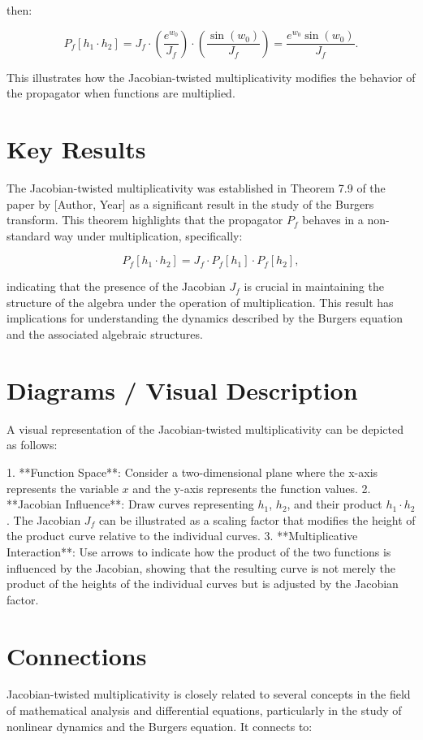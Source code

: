 \documentclass[11pt,a4paper]{article}
\begin{document}
then:

\[
P_f[h_1 \cdot h_2] = J_f \cdot \left(\frac{e^{w_0}}{J_f}\right) \cdot \left(\frac{\sin(w_0)}{J_f}\right) = \frac{e^{w_0} \sin(w_0)}{J_f}.
\]

This illustrates how the Jacobian-twisted multiplicativity modifies the behavior of the propagator when functions are multiplied.

\section{Key Results}
The Jacobian-twisted multiplicativity was established in Theorem 7.9 of the paper by [Author, Year] as a significant result in the study of the Burgers transform. This theorem highlights that the propagator $P_f$ behaves in a non-standard way under multiplication, specifically:

\[
P_f[h_1 \cdot h_2] = J_f \cdot P_f[h_1] \cdot P_f[h_2],
\]

indicating that the presence of the Jacobian $J_f$ is crucial in maintaining the structure of the algebra under the operation of multiplication. This result has implications for understanding the dynamics described by the Burgers equation and the associated algebraic structures.

\section{Diagrams / Visual Description}
A visual representation of the Jacobian-twisted multiplicativity can be depicted as follows:

1. **Function Space**: Consider a two-dimensional plane where the x-axis represents the variable $x$ and the y-axis represents the function values.
2. **Jacobian Influence**: Draw curves representing $h_1$, $h_2$, and their product $h_1 \cdot h_2$. The Jacobian $J_f$ can be illustrated as a scaling factor that modifies the height of the product curve relative to the individual curves.
3. **Multiplicative Interaction**: Use arrows to indicate how the product of the two functions is influenced by the Jacobian, showing that the resulting curve is not merely the product of the heights of the individual curves but is adjusted by the Jacobian factor.

\section{Connections}
Jacobian-twisted multiplicativity is closely related to several concepts in the field of mathematical analysis and differential equations, particularly in the study of nonlinear dynamics and the Burgers equation. It connects to:
\end{document}
